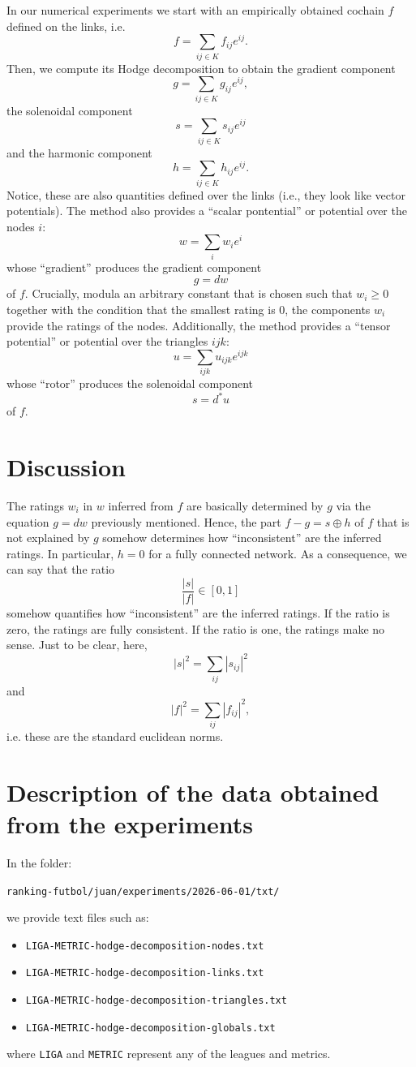 \documentclass[aps,prl,twocolumn,groupedaddress]{revtex4-2}
\begin{document}
In our numerical experiments we start with an empirically obtained cochain $f$ defined on the links, i.e.
$$
f 
= 
\sum_{ij \in K}
f_{ij} e^{ij}.
$$
Then, we compute its Hodge decomposition to obtain the gradient component
$$
g 
= 
\sum_{ij \in K}
g_{ij} e^{ij},
$$
the solenoidal component
$$
s 
= 
\sum_{ij \in K}
s_{ij} e^{ij}
$$
and the harmonic component
$$
h 
= 
\sum_{ij \in K}
h_{ij} e^{ij}.
$$
Notice, these are also quantities defined over the links (i.e., they look like vector potentials).
The method also provides a ``scalar pontential'' or potential over the nodes $i$:
$$
w
=
\sum_i
w_i e^i
$$
whose ``gradient'' produces the gradient component 
$$
g
=
dw
$$
of $f$.
Crucially, modula an arbitrary constant that is chosen such that $w_i\geq 0$ together with the condition that the smallest rating is $0$, the components $w_i$ provide the ratings of the nodes.
Additionally, the method provides a ``tensor potential'' or potential over the triangles $ijk$:
$$
u
=
\sum_{ijk}
u_{ijk} e^{ijk}
$$
whose ``rotor'' produces the solenoidal component
$$
s
=
d^*
u
$$
of $f$.

\section{Discussion}

The ratings $w_i$ in $w$ inferred from $f$ are basically determined by $g$ via the equation $g=dw$ previously mentioned.
Hence, the part $f-g = s\oplus h$ of $f$ that is not explained by $g$ somehow determines how ``inconsistent'' are the inferred ratings.
In particular, $h=0$ for a fully connected network.
As a consequence, we can say that the ratio
$$
\frac{|s|}{|f|} \in [0,1]
$$
somehow quantifies how ``inconsistent'' are the inferred ratings.
If the ratio is zero, the ratings are fully consistent.
If the ratio is one, the ratings make no sense.
Just to be clear, here,
$$
|s|^2 = \sum_{ij} |s_{ij}|^2
$$
and
$$
|f|^2 = \sum_{ij} |f_{ij}|^2,
$$
i.e. these are the standard euclidean norms.

\section{Description of the data obtained from the experiments}

In the folder:

\quad \verb+ranking-futbol/juan/experiments/2026-06-01/txt/+

we provide text files such as:
\begin{itemize}
\item 
\verb+LIGA-METRIC-hodge-decomposition-nodes.txt+
\item 
\verb+LIGA-METRIC-hodge-decomposition-links.txt+
\item 
\verb+LIGA-METRIC-hodge-decomposition-triangles.txt+
\item 
\verb+LIGA-METRIC-hodge-decomposition-globals.txt+
\end{itemize}
where \verb+LIGA+ and \verb+METRIC+ represent any of the leagues and metrics.
\end{document}

